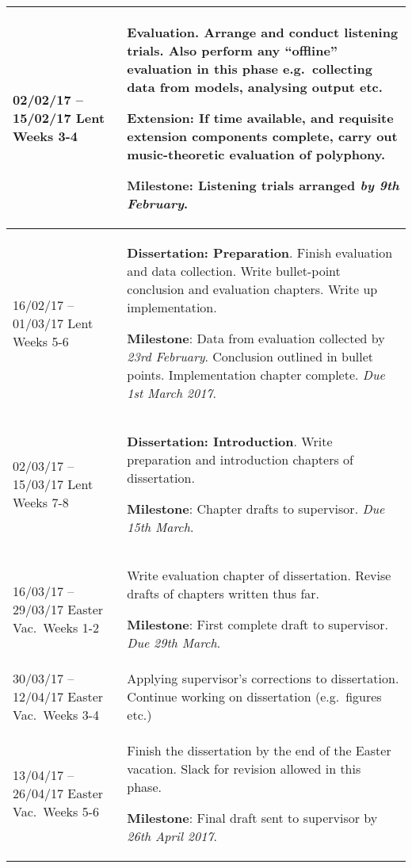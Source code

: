 \documentclass[12pt,a4paper,twoside]{article}
\begin{document}
\begin{longtable}{ p{4cm} | p{11cm} }
02/02/17 -- 15/02/17 Lent Weeks 3-4 & \textbf{Evaluation}.
Arrange and conduct listening trials. Also perform any ``offline'' evaluation in
this phase e.g.\ collecting data from models, analysing output etc. \newline

\textbf{Extension}: If time available, and requisite extension components
complete, carry out music-theoretic evaluation of polyphony. \newline

\textbf{Milestone}: Listening trials arranged \emph{by 9th February}.
\\ \hline

16/02/17 -- 01/03/17 Lent Weeks 5-6 & \textbf{Dissertation: Preparation}.
Finish evaluation and data collection. Write bullet-point conclusion and 
evaluation chapters. Write up implementation. \newline

\textbf{Milestone}: Data from evaluation collected by \emph{23rd February}.
Conclusion outlined in bullet points. Implementation chapter
complete. \emph{Due 1st March 2017}.
\\ \hline

02/03/17 -- 15/03/17 Lent Weeks 7-8 & \textbf{Dissertation: Introduction}.
Write preparation and introduction chapters of dissertation. \newline

\textbf{Milestone}: Chapter drafts to supervisor. \emph{Due 15th March}.
\\ \hline

16/03/17 -- 29/03/17 Easter Vac.\ Weeks 1-2 & Write evaluation chapter of
dissertation. Revise drafts of chapters written thus far. \newline

\textbf{Milestone}: First complete draft to supervisor. \emph{Due 29th March}.
\\ \hline

30/03/17 -- 12/04/17 Easter Vac.\ Weeks 3-4 & 
Applying supervisor's corrections to dissertation. Continue working on
dissertation (e.g.\ figures etc.)
\\ \hline

13/04/17 -- 26/04/17 Easter Vac.\ Weeks 5-6 & 
Finish the dissertation by the end of the Easter vacation. Slack for revision
allowed in this phase. \newline

\textbf{Milestone}: Final draft sent to supervisor by \emph{26th April 2017}.
\\ \hline
\end{longtable}

\printbibliography
\end{document}
